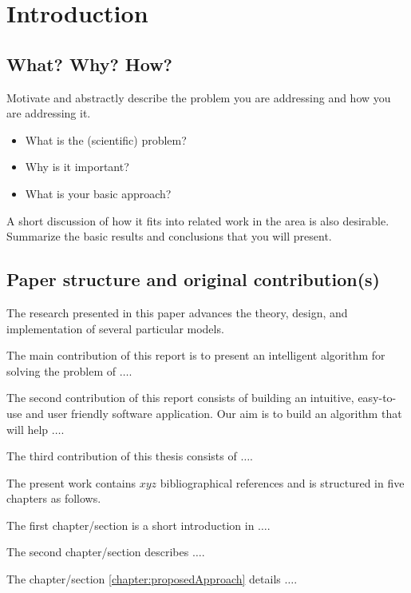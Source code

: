 \chapter{Introduction}
\label{chapter:introduction}

\section{What? Why? How?}
\label{section:what}

Motivate and abstractly describe the problem you are addressing and how you are addressing it. 
\begin{itemize}
	\item What is the (scientific) problem? 
	\item Why is it important? 
	\item What is your basic approach? 
\end{itemize}

A short discussion of how it fits into related work in the area is also desirable. Summarize the basic results and conclusions that you will present. 

\section{Paper structure and original contribution(s)}
\label{section:structure}

The research presented in this paper advances the theory, design, and implementation of several particular models. 

The main contribution of this report is to present an intelligent algorithm for solving the problem of $\ldots$.

The second contribution of this report consists of building an intuitive, easy-to-use and user
friendly software application. Our aim is to build an algorithm that will help $\ldots$.

The third contribution of this thesis consists of $\ldots$.

The present work contains $xyz$ bibliographical references and is structured in five chapters as follows.

The first chapter/section is a short introduction in $\ldots$.

The second chapter/section describes $\ldots$.

The chapter/section \ref{chapter:proposedApproach} details $\ldots$.

